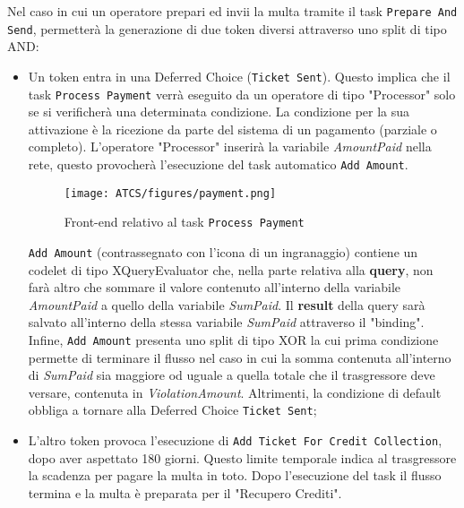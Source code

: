 \documentclass[../Relazione.tex]{subfiles}
\begin{document}
    Nel caso in cui un operatore prepari ed invii la multa tramite il task \texttt{Prepare And Send}, permetterà la generazione di due token diversi attraverso uno split di tipo AND:
    \begin{itemize}
        \item Un token entra in una Deferred Choice (\texttt{Ticket Sent}). Questo implica che il task \texttt{Process Payment} verrà eseguito da un operatore di tipo "Processor" solo se si verificherà una determinata condizione. La condizione per la sua attivazione è la ricezione da parte del sistema di un pagamento (parziale o completo). L'operatore "Processor" inserirà la variabile \textit{AmountPaid} nella rete, questo provocherà l'esecuzione del task automatico \texttt{Add Amount}.
        
        \begin{figure}[h]
            \centering
            \texttt{[image: ATCS/figures/payment.png]}
            \caption{Front-end relativo al task \texttt{Process Payment}}
            \label{fig:pay}
        \end{figure}
        
        \noindent \texttt{Add Amount} (contrassegnato con l'icona di un ingranaggio) contiene un codelet di tipo XQueryEvaluator che, nella parte relativa alla \textbf{query}, non farà altro che sommare il valore contenuto all'interno della variabile \textit{AmountPaid} a quello della variabile \textit{SumPaid}. Il \textbf{result} della query sarà salvato all'interno della stessa variabile \textit{SumPaid} attraverso il "binding".\\
        Infine, \texttt{Add Amount} presenta uno split di tipo XOR la cui prima condizione permette di terminare il flusso nel caso in cui la somma contenuta all'interno di \textit{SumPaid} sia maggiore od uguale a quella totale che il trasgressore deve versare, contenuta in \textit{ViolationAmount}. Altrimenti, la condizione di default obbliga a tornare alla Deferred Choice \texttt{Ticket Sent};
        \item L'altro token provoca l'esecuzione di \texttt{Add Ticket For Credit Collection}, dopo aver aspettato 180 giorni. Questo limite temporale indica al trasgressore la scadenza per pagare la multa in toto. Dopo l'esecuzione del task il flusso termina e la multa è preparata per il "Recupero Crediti".
    \end{itemize}
    
\end{document}
